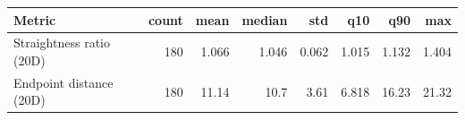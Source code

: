 \begin{tabular}{lrrrrrrr}
\toprule
Metric & count & mean & median & std & q10 & q90 & max \\
\midrule
Straightness ratio (20D) & 180 & 1.066 & 1.046 & 0.062 & 1.015 & 1.132 & 1.404 \\
Endpoint distance (20D) & 180 & 11.14 & 10.7 & 3.61 & 6.818 & 16.23 & 21.32 \\
\bottomrule
\end{tabular}
